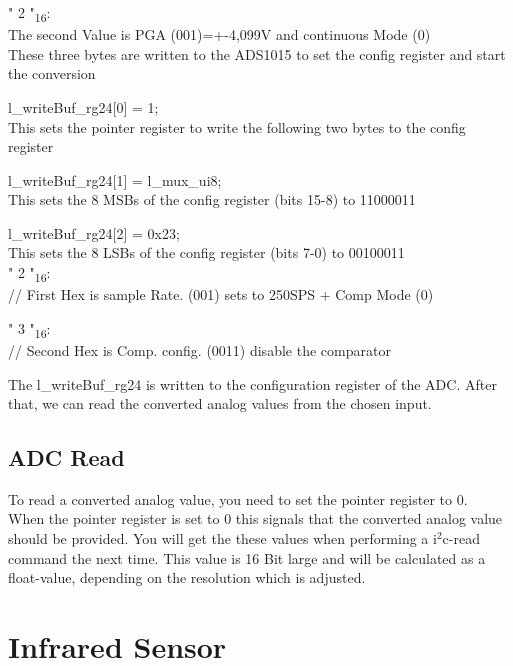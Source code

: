 " 2 "\textsubscript{16}: \\
The second Value is PGA (001)=+-4,099V and continuous Mode (0)\\


These three bytes are written to the ADS1015 to set the config register and start the conversion 

l\_writeBuf\_rg24[0] = 1;		\\ 
This sets the pointer register to write the following two bytes to the config register

l\_writeBuf\_rg24[1] = l\_mux\_ui8;   	\\ 
This sets the 8 MSBs of the config register (bits 15-8) to 11000011

l\_writeBuf\_rg24[2] = 0x23;  		\\ 
This sets the 8 LSBs of the config register (bits  7-0) to 00100011\\   


" 2 "\textsubscript{16}:\\
  // First Hex is sample Rate. (001) sets to 250SPS + Comp Mode (0)
	
" 3 "\textsubscript{16}:\\
  // Second Hex is Comp. config. (0011) disable the comparator
	
	
	
The l\_writeBuf\_rg24 is written to the configuration register of the ADC. After that, we can read the converted analog values from the chosen input.



\subsection{ADC Read}

To read a converted analog value, you need to set the pointer register to 0.\\

When the pointer register is set to 0 this signals that the converted analog value should be provided. You will get the these values when performing a i$^2$c-read command the next time. This value is 16 Bit large and will be calculated as a float-value, depending on the resolution which is adjusted.






\section{Infrared Sensor}

